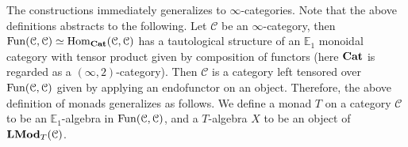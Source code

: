 \begin{defn}
		The constructions immediately generalizes to $\infty$-categories. Note that the above definitions abstracts to the following. Let $\mathcal{C}$ be an $\infty$-category, then $\operatorname{\mathrm{Fun}}(\mathcal{C},\mathcal{C})\simeq\operatorname{\mathrm{Hom}}_{\mathbf{Cat}}(\mathcal{C},\mathcal{C})$ has a tautological structure of an $\mathbb{E}_1$ monoidal category with tensor product given by composition of functors (here $\mathbf{Cat}$ is regarded as a $(\infty,2)$-category). Then $\mathcal{C}$ is a category left tensored over $\operatorname{\mathrm{Fun}}(\mathcal{C},\mathcal{C})$ given by applying an endofunctor on an object. Therefore, the above definition of monads generalizes as follows. We define a monad $T$ on a category $\mathcal{C}$ to be an $\mathbb{E}_1$-algebra in $\operatorname{\mathrm{Fun}}(\mathcal{C},\mathcal{C})$, and a $T$-algebra $X$ to be an object of $\mathbf{LMod}_T(\mathcal{C})$. 
	\end{defn}

